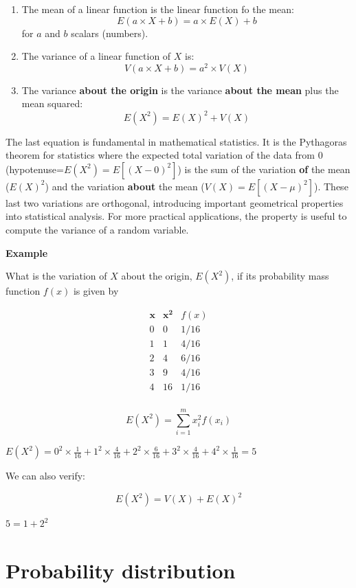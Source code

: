 \documentclass[
]{book}
\begin{document}
\begin{enumerate}
\def\labelenumi{\arabic{enumi})}
\item
  The mean of a linear function is the linear function fo the mean: \[E(a\times X +b)= a\times E(X) +b\] for \(a\) and \(b\) scalars (numbers).
\item
  The variance of a linear function of \(X\) is:\[V(a\times X +b)= a^2\times V(X)\]
\item
  The variance \textbf{about the origin} is the variance \textbf{about the mean} plus the mean squared: \[E(X^2)=E(X)^2 + V(X)\]
\end{enumerate}

The last equation is fundamental in mathematical statistics. It is the Pythagoras theorem for statistics where the expected total variation of the data from \(0\) (hypotenuse=\(E(X^2)=E[(X-0)^2]\)) is the sum of the variation \textbf{of} the mean (\(E(X)^2\)) and the variation \textbf{about} the mean (\(V(X)=E[(X-\mu)^2]\)). These last two variations are orthogonal, introducing important geometrical properties into statistical analysis. For more practical applications, the property is useful to compute the variance of a random variable.

\textbf{Example}

What is the variation of \(X\) about the origin, \(E(X^2)\), if its probability mass function \(f(x)\) is given by

\[
\begin{array}{ccc}
\mathbf{x} &\mathbf{x^2} & f(x) \\
0 & 0 &1/16 \\
1 & 1 &4/16 \\
2 & 4 &6/16 \\
3 & 9 &4/16 \\
4 & 16 &1/16 \\
\end{array}
\]

\[E(X^2) =\sum_{i=1}^m x_i^2 f(x_i)\]

\(E(X^2)=0^2 \times \frac{1}{16} + 1^2 \times \frac{4}{16} + 2^2 \times \frac{6}{16} + 3^2 \times \frac{4}{16} + 4^2 \times \frac{1}{16} =5\)

We can also verify:

\[E(X^2)=V(X)+E(X)^2\]

\(5=1+2^2\)

\hypertarget{probability-distribution}{%
\section{Probability distribution}\label{probability-distribution}}
\end{document}
